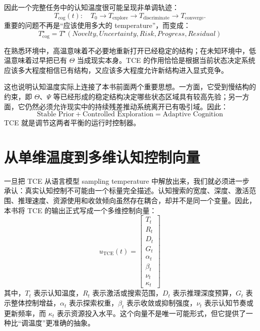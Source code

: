 因此一个完整任务中的认知温度很可能呈现非单调轨迹：
\begin{equation}
    T_{\mathrm{cog}}(t):
    \quad
    T_0
    \rightarrow
    T_{\mathrm{explore}}
    \rightarrow
    T_{\mathrm{discriminate}}
    \rightarrow
    T_{\mathrm{converge}}.
\end{equation}
重要的问题不再是“应该使用多大的 temperature”，而变成：
\begin{equation}
    \boxed{
    T_{\mathrm{cog}}^\star
    =
    T^\star
    (
    Novelty,
    Uncertainty,
    Risk,
    Progress,
    Residual
    )
    }
\end{equation}

在熟悉环境中，高温意味着不必要地重新打开已经稳定的结构；在未知环境中，低温意味着过早把已有 $\Theta$ 当成现实本身。TCE 的作用恰恰是根据当前状态决定系统应该多大程度相信已有结构，又应该多大程度允许新结构进入显式竞争。

这也说明认知温度实际上连接了本书前面两个重要思想。一方面，它受到慢结构的约束，即 $\Theta$、$\Psi$ 等已经形成的稳定结构决定哪些状态区域具有较高先验；另一方面，它仍然必须允许现实中的持续残差推动系统离开已有吸引域。因此：
\begin{equation}
    \boxed{
    \text{Stable Prior}
    +
    \text{Controlled Exploration}
    =
    \text{Adaptive Cognition}
    }
\end{equation}
TCE 就是调节这两者平衡的运行时控制器。

\section{从单维温度到多维认知控制向量}

一旦把 TCE 从语言模型 sampling temperature 中解放出来，我们就必须进一步承认：真实认知控制不可能由一个标量完全描述。认知搜索的宽度、深度、激活范围、推理速度、资源使用和收敛倾向虽然存在耦合，却并不是同一个变量。因此，本书将 TCE 的输出正式写成一个多维控制向量：
\begin{equation}
    \boxed{
    u_{\mathrm{TCE}}(t)
    =
    \begin{bmatrix}
    T_t\\
    R_t\\
    D_t\\
    G_t\\
    \alpha_t\\
    \beta_t\\
    \nu_t\\
    \kappa_t
    \end{bmatrix}
    }
\end{equation}
其中，$T_t$ 表示认知温度，$R_t$ 表示激活或搜索范围，$D_t$ 表示推理深度预算，$G_t$ 表示整体控制增益，$\alpha_t$ 表示探索权重，$\beta_t$ 表示收敛或抑制强度，$\nu_t$ 表示认知节奏或更新频率，而 $\kappa_t$ 表示资源投入水平。这个向量不是唯一可能形式，但它提供了一种比“调温度”更准确的抽象。

